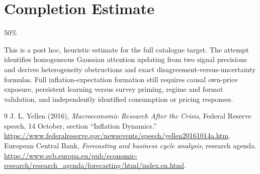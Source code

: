 \documentclass[11pt]{article}
\theoremstyle{definition}
\begin{document}
\section{Completion Estimate}
50\%

This is a post hoc, heuristic estimate for the full catalogue target.
The attempt identifies homogeneous Gaussian attention updating from two signal precisions and derives heterogeneity obstructions and exact disagreement-versus-uncertainty formulas. Full inflation-expectation formation still requires causal own-price exposure, persistent learning versus survey priming, regime and format validation, and independently identified consumption or pricing responses.

\begin{thebibliography}{9}
 J. L. Yellen (2016), \emph{Macroeconomic Research After the Crisis}, Federal Reserve speech, 14 October, section ``Inflation Dynamics.'' \url{https://www.federalreserve.gov/newsevents/speech/yellen20161014a.htm}.
 European Central Bank, \emph{Forecasting and business cycle analysis}, research agenda. \url{https://www.ecb.europa.eu/pub/economic-research/research_agenda/forecasting/html/index.en.html}.
\end{thebibliography}
\end{document}

